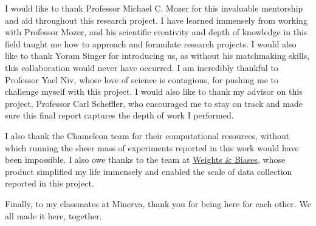 I would like to thank Professor Michael C. Mozer for this invaluable mentorship and aid throughout this research project. I have learned immensely from working with Professor Mozer, and his scientific creativity and depth of knowledge in this field taught me how to approach and formulate research projects. I would also like to thank Yoram Singer for introducing us, as without his matchmaking skills, this collaboration would never have occurred. I am incredibly thankful to Professor Yael Niv, whose love of science is contagious, for pushing me to challenge myself with this project. I would also like to thank my advisor on this project, Professor Carl Scheffler, who encouraged me to stay on track and made sure this final report captures the depth of work I performed.

I also thank the Chameleon team \parencite{Keahey2018} for their computational resources, without which running the sheer mass of experiments reported in this work would have been impossible. I also owe thanks to the team at \href{https://www.wandb.com/}{Weights \& Biases}, whose product simplified my life immensely and enabled the scale of data collection reported in this project. 

Finally, to my classmates at Minerva, thank you for being here for each other. We all made it here, together. 